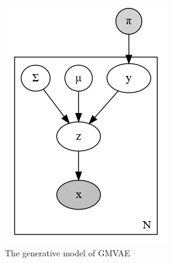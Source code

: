 \documentclass[11pt, a4paper]{report}
\theoremstyle{plain}
\theoremstyle{definition}
\theoremstyle{remark}
\begin{document}
\begin{figure}[h]
\centering
\begin{subfigure}[b]{0.4\textwidth}
\includegraphics[width=\textwidth]{plots/mmpd.gv.png}
\caption{The generative model of GMVAE~\cite{dilokthanakul2016deep}}
\label{fig:dilomix}
\end{subfigure}
\begin{subfigure}[b]{0.4\textwidth}

\end{subfigure}
\end{figure}
\end{document}
